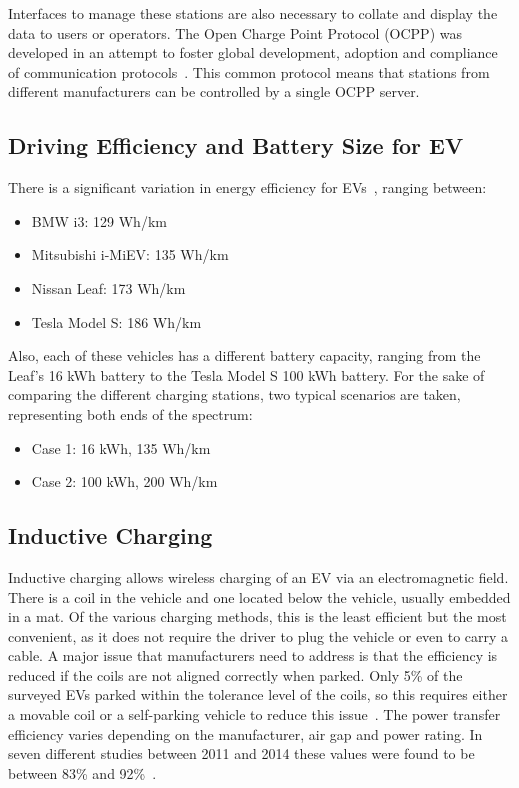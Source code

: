 Interfaces to manage these stations are also necessary to collate and display the data to users or operators. The Open Charge Point Protocol (OCPP) was developed in an attempt to foster global development, adoption and compliance of communication protocols~\cite{open_charge_alliance_ocpp_nodate}. This common protocol means that stations from different manufacturers can be controlled by a single OCPP server. 

\subsection{Driving Efficiency and Battery Size for EV}
There is a significant variation in energy efficiency for EVs~\cite{australian_government_green_nodate}, ranging between:
\begin{itemize}
	\item BMW i3: 129 Wh/km
	\item Mitsubishi i-MiEV: 135 Wh/km
	\item Nissan Leaf: 173 Wh/km
	\item Tesla Model S: 186 Wh/km
\end{itemize}
Also, each of these vehicles has a different battery capacity, ranging from the Leaf’s 16 kWh battery to the Tesla Model S 100 kWh battery. For the sake of comparing the different charging stations, two typical scenarios are taken, representing both ends of the spectrum:
\begin{itemize}
	\item Case 1: 16 kWh, 135 Wh/km
	\item Case 2: 100 kWh, 200 Wh/km
\end{itemize}

\subsection{Inductive Charging}
Inductive charging allows wireless charging of an EV via an electromagnetic field.  There is a coil in the vehicle and one located below the vehicle, usually embedded in a mat. Of the various charging methods, this is the least efficient but the most convenient, as it does not require the driver to plug the vehicle or even to carry a cable. A major issue that manufacturers need to address is that the efficiency is reduced if the coils are not aligned correctly when parked. Only 5\% of the surveyed EVs parked within the tolerance level of the coils, so this requires either a movable coil or a self-parking vehicle to reduce this issue~\cite{birrell_how_2015}. The power transfer efficiency varies depending on the manufacturer, air gap and power rating. In seven different studies between 2011 and 2014 these values were found to be between 83\% and 92\%~\cite{kalwar_inductively_2015}. 

